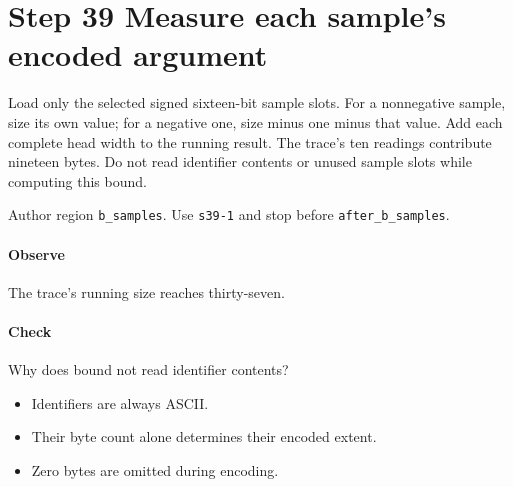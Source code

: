 \section{Step 39 Measure each sample's encoded argument}\label{cbor-s39}
Load only the selected signed sixteen-bit sample slots. For a nonnegative sample, size its own value; for a negative one, size minus one minus that value. Add each complete head width to the running result. The trace's ten readings contribute nineteen bytes. Do not read identifier contents or unused sample slots while computing this bound.

Author region \texttt{b\_samples}. Use \texttt{s39-1} and stop before \texttt{after\_b\_samples}.

\paragraph{Observe} The trace's running size reaches thirty-seven.

\paragraph{Check} Why does bound not read identifier contents?
\begin{itemize}
\item[A.] Identifiers are always ASCII.
\item[B.] Their byte count alone determines their encoded extent.
\item[C.] Zero bytes are omitted during encoding.
\end{itemize}
